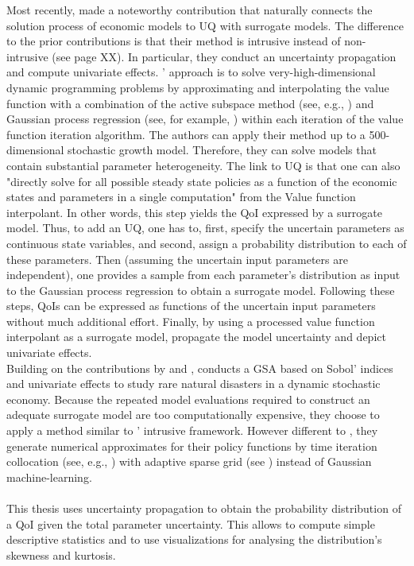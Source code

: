 Most recently, \cite{Scheidegger.2019} made a noteworthy contribution that naturally connects the solution process of economic models to UQ with surrogate models. The difference to the prior contributions is that their method is intrusive instead of non-intrusive (see page XX). In particular, they conduct an uncertainty propagation and compute univariate effects. \citeauthor{Scheidegger.2019}' approach is to solve very-high-dimensional dynamic programming problems by approximating and interpolating the value function with a combination of the active subspace method (see, e.g., \cite{Constantine.2015}) and Gaussian process regression (see, for example, \cite{Rasmussen.2005}) within each iteration of the value function iteration algorithm. The authors can apply their method up to a 500-dimensional stochastic growth model. Therefore, they can solve models that contain substantial parameter heterogeneity.
The link to UQ is that one can also "directly solve for all possible steady state policies as a function of the economic states and parameters in a single computation" \cite[p.~4]{Scheidegger.2019} from the Value function interpolant. In other words, this step yields the QoI expressed by a surrogate model. Thus, to add an UQ, one has to, first, specify the uncertain parameters as continuous state variables, and second, assign a probability distribution to each of these parameters. Then (assuming the uncertain input parameters are independent), one provides a sample from each parameter's distribution as input to the Gaussian process regression to obtain a surrogate model. Following these steps, QoIs can be expressed as functions of the uncertain input parameters without much additional effort. Finally, by using a processed value function interpolant as a surrogate model, \citeauthor{Scheidegger.2019} propagate the model uncertainty and depict univariate effects.\\
\newline
Building on the contributions by \cite{Harenberg.2019} and \cite{Scheidegger.2019}, \cite{Usui.2019} conducts a GSA based on Sobol' indices and univariate effects to study rare natural disasters in a dynamic stochastic economy. Because the repeated model evaluations required to construct an adequate surrogate model are too computationally expensive, they choose to apply a  method similar to \citeauthor{Scheidegger.2019}' intrusive framework. However different to \cite{Scheidegger.2019}, they generate numerical approximates for their policy functions by time iteration collocation (see, e.g., \cite{Judd.1998}) with adaptive sparse grid (see  \cite{Scheidegger.2018}) instead of Gaussian machine-learning.\\
\\
This thesis uses uncertainty propagation to obtain the probability distribution of a QoI given the total parameter uncertainty. This allows to compute simple descriptive statistics and to use visualizations for analysing the distribution's skewness and kurtosis.

